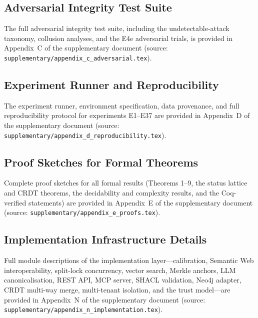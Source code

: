 \documentclass[11pt,a4paper]{article}
\theoremstyle{definition}
\theoremstyle{remark}
\begin{document}
\subsection{Adversarial Integrity Test Suite}\label{app:adversarial}
The full adversarial integrity test suite, including the undetectable-attack
taxonomy, collusion analyses, and the E4e adversarial trials, is provided in
Appendix~C of the supplementary document (source:
\texttt{supplementary/appendix\_c\_adversarial.tex}).

\subsection{Experiment Runner and Reproducibility}\label{app:reproduce}
The experiment runner, environment specification, data provenance, and full
reproducibility protocol for experiments E1--E37 are provided in Appendix~D
of the supplementary document (source:
\texttt{supplementary/appendix\_d\_reproducibility.tex}).

\subsection{Proof Sketches for Formal Theorems}\label{app:proofs}
Complete proof sketches for all formal results (Theorems 1--9, the status
lattice and CRDT theorems, the decidability and complexity results, and the
Coq-verified statements) are provided in Appendix~E of the supplementary
document (source: \texttt{supplementary/appendix\_e\_proofs.tex}).

\subsection{Implementation Infrastructure Details}\label{app:implementation}
Full module descriptions of the implementation layer---calibration, Semantic
Web interoperability, split-lock concurrency, vector search, Merkle anchors,
LLM canonicalisation, REST API, MCP server, SHACL validation, Neo4j adapter,
CRDT multi-way merge, multi-tenant isolation, and the trust model---are
provided in Appendix~N of the supplementary document (source:
\texttt{supplementary/appendix\_n\_implementation.tex}).


\setlength{\bibsep}{0.0em plus 0.3ex}

\end{document}
